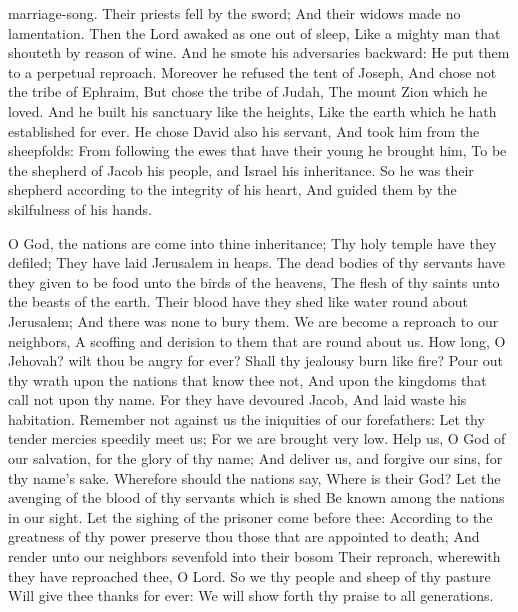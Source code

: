 marriage-song.  Their priests fell by the sword; And their widows made no lamentation.  Then the Lord awaked as one out of sleep, Like a mighty man that shouteth by reason of wine.  And he smote his adversaries backward: He put them to a perpetual reproach.  Moreover he refused the tent of Joseph, And chose not the tribe of Ephraim,  But chose the tribe of Judah, The mount Zion which he loved.  And he built his sanctuary like the heights, Like the earth which he hath established for ever.  He chose David also his servant, And took him from the sheepfolds:  From following the ewes that have their young he brought him, To be the shepherd of Jacob his people, and Israel his inheritance.  So he was their shepherd according to the integrity of his heart, And guided them by the skilfulness of his hands. 

O God, the nations are come into thine inheritance; Thy holy temple have they defiled; They have laid Jerusalem in heaps.  The dead bodies of thy servants have they given to be food unto the birds of the heavens, The flesh of thy saints unto the beasts of the earth.  Their blood have they shed like water round about Jerusalem; And there was none to bury them.  We are become a reproach to our neighbors, A scoffing and derision to them that are round about us.  How long, O Jehovah? wilt thou be angry for ever? Shall thy jealousy burn like fire?  Pour out thy wrath upon the nations that know thee not, And upon the kingdoms that call not upon thy name.  For they have devoured Jacob, And laid waste his habitation.  Remember not against us the iniquities of our forefathers: Let thy tender mercies speedily meet us; For we are brought very low.  Help us, O God of our salvation, for the glory of thy name; And deliver us, and forgive our sins, for thy name’s sake.  Wherefore should the nations say, Where is their God? Let the avenging of the blood of thy servants which is shed Be known among the nations in our sight.  Let the sighing of the prisoner come before thee: According to the greatness of thy power preserve thou those that are appointed to death;  And render unto our neighbors sevenfold into their bosom Their reproach, wherewith they have reproached thee, O Lord.  So we thy people and sheep of thy pasture Will give thee thanks for ever: We will show forth thy praise to all generations. 


